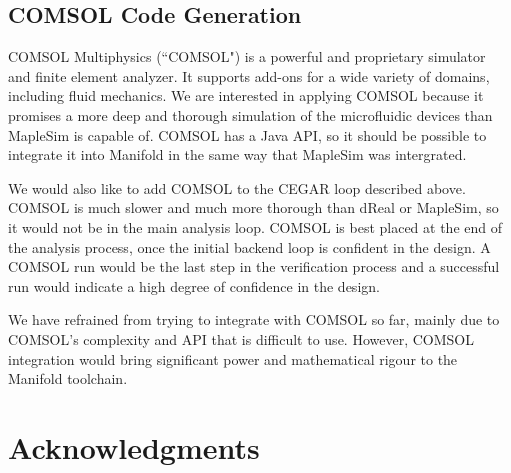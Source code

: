 \subsection{COMSOL Code Generation}

COMSOL Multiphysics (``COMSOL") is a powerful and proprietary simulator and finite element analyzer.
It supports add-ons for a wide variety of domains, including fluid mechanics.
We are interested in applying COMSOL because it promises a more deep and thorough simulation of the microfluidic devices than MapleSim is capable of.
COMSOL has a Java API, so it should be possible to integrate it into Manifold in the
same way that MapleSim was intergrated.


We would also like to add COMSOL to the CEGAR loop described above.
COMSOL is much slower and much more thorough than dReal or MapleSim, so it would not be in the main analysis loop.
COMSOL is best placed at the end of the analysis process, once the initial backend loop is confident in the design.
A COMSOL run would be the last step in the verification process and a successful run would indicate a high degree of confidence in the design.

We have refrained from trying to integrate with COMSOL so far, mainly due to COMSOL's
complexity and API that is difficult to use.
However, COMSOL integration would bring significant power and mathematical rigour to the Manifold toolchain.

\section{Acknowledgments}


